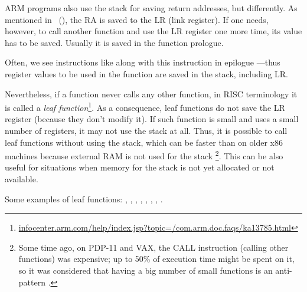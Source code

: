 
ARM programs also use the stack for saving return addresses, but differently.
As mentioned in \q{\HelloWorldSectionName}~(),
the \ac{RA} is saved to the \ac{LR} (\gls{link register}).
If one needs, however, to call another function and use the \ac{LR} register
one more time, its value has to be saved.
Usually it is saved in the function prologue.

Often, we see instructions like  along with this instruction in epilogue
---thus register values to be used in the function are saved in the stack, including \ac{LR}.

Nevertheless, if a function never calls any other function, in \ac{RISC} terminology it is called a
\emph{\gls{leaf function}}\footnote{\href{http://infocenter.arm.com/help/index.jsp?topic=/com.arm.doc.faqs/ka13785.html}{infocenter.arm.com/help/index.jsp?topic=/com.arm.doc.faqs/ka13785.html}}. 
As a consequence, leaf functions do not save the \ac{LR} register (because they don't modify it).
If such function is small and uses a small number of registers, it may not use the stack at all.
Thus, it is possible to call leaf functions without using the stack,
which can be faster than on older x86 machines because external RAM is not used for the stack
\footnote{Some time ago, on PDP-11 and VAX, the CALL instruction (calling other functions) was expensive; up to 50\%
of execution time might be spent on it, so it was considered that having a big number of small functions is an \gls{anti-pattern} .}.
This can be also useful for situations when memory for the stack is not yet allocated or not available.

Some examples of leaf functions:
, , 
, , ,
, , .

